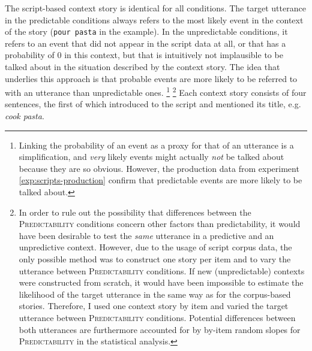 The script-based context story is identical for all conditions. The target utterance in the predictable conditions always refers to the most likely event in the context of the story (\texttt{pour pasta} in the example). In the unpredictable conditions, it refers to an event that did not appear in the script data at all, or that has a probability of 0 in this context, but that is intuitively not implausible to be talked about in the situation described by the context story. The idea that underlies this approach is that probable events are more likely to be referred to with an utterance than unpredictable ones.%
%
\footnote{Linking the probability of an event as a proxy for that of an utterance is a simplification, and \textit{very} likely events might actually \textit{not} be talked about because they are so obvious. However, the production data from experiment \ref{exp:scripts-production} confirm that predictable events are more likely to be talked about.}\afterfn%
%
\footnote{In order to rule out the possibility that differences between the \textsc{Predictability} conditions concern other factors than predictability, it would have been desirable to test the \textit{same} utterance in a predictive and an unpredictive context. However, due to the usage of script corpus data, the only possible method was to construct one story per item and to vary the utterance between \textsc{Predictability} conditions. If new (unpredictable) contexts were constructed from scratch, it would have been impossible to estimate the likelihood of the target utterance in the same way as for the corpus-based stories. Therefore, I used one context story by item and varied the target utterance between \textsc{Predictability} conditions. Potential differences between both utterances are furthermore accounted for by by-item random slopes for \textsc{Predictability} in the statistical analysis.}\afterfn%
%
Each context story consists of four sentences, the first of which introduced to the script and mentioned its title, e.g. \textit{cook pasta}.%
% 
